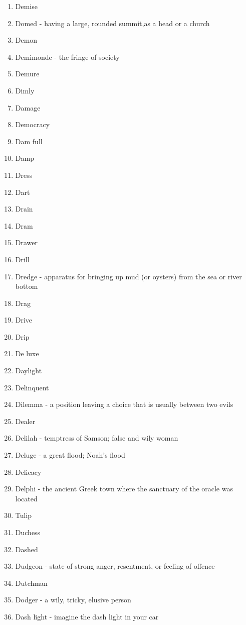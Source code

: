 \begin{enumerate}
        \item Demise
        \item Domed - having a large, rounded summit,as a head or a church
        \item Demon
        \item Demimonde - the fringe of society
        \item Demure
        \item Dimly
        \item Damage
        \item Democracy
        \item Dam full
        \item Damp
        \item Dress
        \item Dart
        \item Drain
        \item Dram
        \item Drawer
        \item Drill
        \item Dredge - apparatus for bringing up mud (or oysters) from the sea or river bottom
        \item Drag
        \item Drive
        \item Drip
        \item De luxe
        \item Daylight
        \item Delinquent
        \item Dilemma - a position leaving a choice that is usually between two evils
        \item Dealer
        \item Delilah - temptress of Samson; false and wily woman
        \item Deluge - a great flood; Noah's flood
        \item Delicacy
        \item Delphi - the ancient Greek town where the sanctuary of the oracle was located
        \item Tulip
        \item Duchess
        \item Dashed
        \item Dudgeon - state of strong anger, resentment, or feeling of offence
        \item Dutchman
        \item Dodger - a wily, tricky, elusive person
        \item Dash light - imagine the dash light in your car

\end{enumerate}
